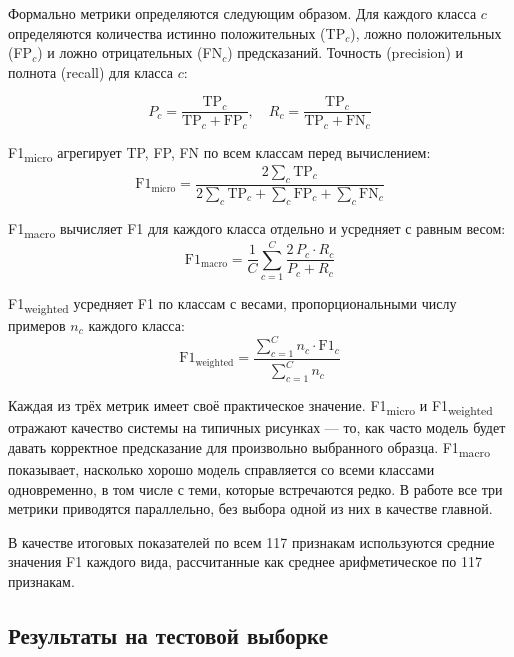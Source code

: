 Формально метрики определяются следующим образом. Для каждого класса $c$ определяются количества истинно положительных (TP$_c$), ложно положительных (FP$_c$) и ложно отрицательных (FN$_c$) предсказаний. Точность (precision) и полнота (recall) для класса $c$:  

\begin{equation}
P_c = \frac{\text{TP}_c}{\text{TP}_c + \text{FP}_c}, \quad R_c = \frac{\text{TP}_c}{\text{TP}_c + \text{FN}_c}
\end{equation}

F1\textsubscript{micro} агрегирует TP, FP, FN по всем классам перед вычислением:
\begin{equation}
\text{F1}_{\text{micro}} = \frac{2 \sum_c \text{TP}_c}{2 \sum_c \text{TP}_c + \sum_c \text{FP}_c + \sum_c \text{FN}_c}
\end{equation}

F1\textsubscript{macro} вычисляет F1 для каждого класса отдельно и усредняет с равным весом:
\begin{equation}
\text{F1}_{\text{macro}} = \frac{1}{C} \sum_{c=1}^{C} \frac{2\, P_c \cdot R_c}{P_c + R_c}
\end{equation}

F1\textsubscript{weighted} усредняет F1 по классам с весами, пропорциональными числу примеров $n_c$ каждого класса:
\begin{equation}
\text{F1}_{\text{weighted}} = \frac{\sum_{c=1}^{C} n_c \cdot \text{F1}_c}{\sum_{c=1}^{C} n_c}
\end{equation}

Каждая из трёх метрик имеет своё практическое значение. F1\textsubscript{micro} и F1\textsubscript{weighted} отражают качество системы на типичных рисунках --- то, как часто модель будет давать корректное предсказание для произвольно выбранного образца. F1\textsubscript{macro} показывает, насколько хорошо модель справляется со всеми классами одновременно, в том числе с теми, которые встречаются редко. В работе все три метрики приводятся параллельно, без выбора одной из них в качестве главной.

В качестве итоговых показателей по всем 117 признакам используются средние значения F1 каждого вида, рассчитанные как среднее арифметическое по 117 признакам.

\subsection{Результаты на тестовой выборке}

